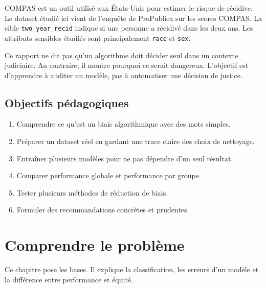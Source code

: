 \documentclass[12pt,a4paper]{report}
\begin{document}
COMPAS est un outil utilisé aux États-Unis pour estimer le risque de récidive. Le dataset étudié ici vient de l'enquête de ProPublica sur les scores COMPAS. La cible \texttt{two\_year\_recid} indique si une personne a récidivé dans les deux ans. Les attributs sensibles étudiés sont principalement \texttt{race} et \texttt{sex}.

\begin{tcolorbox}[dangerbox, title={Point éthique majeur}]
Ce rapport ne dit pas qu'un algorithme doit décider seul dans un contexte judiciaire. Au contraire, il montre pourquoi ce serait dangereux. L'objectif est d'apprendre à auditer un modèle, pas à automatiser une décision de justice.
\end{tcolorbox}

\section*{Objectifs pédagogiques}

\begin{tcolorbox}[primarybox, title={Objectifs du projet}]
\begin{enumerate}
  \item Comprendre ce qu'est un biais algorithmique avec des mots simples.
  \item Préparer un dataset réel en gardant une trace claire des choix de nettoyage.
  \item Entraîner plusieurs modèles pour ne pas dépendre d'un seul résultat.
  \item Comparer performance globale et performance par groupe.
  \item Tester plusieurs méthodes de réduction de biais.
  \item Formuler des recommandations concrètes et prudentes.
\end{enumerate}
\end{tcolorbox}

\clearpage
{}
\chapter{Comprendre le problème}

\begin{tcolorbox}[infobox]
Ce chapitre pose les bases. Il explique la classification, les erreurs d'un modèle et la différence entre performance et équité.
\end{tcolorbox}
\end{document}
